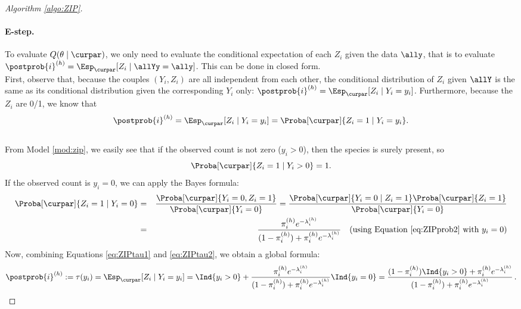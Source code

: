 \begin{proof}[Algorithm \ref{algo:ZIP}]
\paragraph{E-step.}
To evaluate $Q(\theta \mid \curpar)$, we only need to evaluate the conditional expectation of each $Z_i$ given the data $\ally$, that is to evaluate $\postprob{i}^{(h)} = \Esp_{\curpar}[Z_i \mid \allYy=\ally]$. This can be done in closed form. \\
First, observe that, because the couples $(Y_i, Z_i)$ are all independent from each other, the conditional distribution of $Z_i$ given $\allY$ is the same as its conditional distribution given the corresponding  $Y_i$ only: $
\postprob{i}^{(h)} = \Esp_{\curpar}[Z_i \mid Y_i=y_i]$. 
Furthermore, because the $Z_i$ are 0/1, we know that $$ \postprob{i}^{(h)} = \Esp_{\curpar}[Z_i \mid Y_i=y_i] = \Proba[\curpar]{Z_i = 1 \mid Y_i=y_i}.$$ \\
From Model \eqref{mod:zip}, we easily see that if the observed count is not zero ($y_i > 0$), then the species is surely present, so 
\begin{equation}\label{eq:ZIPtau1}
\Proba[\curpar]{Z_i = 1 \mid Y_i >0} = 1.
\end{equation}
If the observed count is $y_i=0$, we can apply the Bayes formula: 
\begin{eqnarray}\label{eq:ZIPtau2}
\Proba[\curpar]{Z_i = 1 \mid Y_i= 0} &=&  \frac{\Proba[\curpar]{Y_i= 0 ,  Z_i = 1}}{\Proba[\curpar]{Y_i= 0}} = \frac{\Proba[\curpar]{Y_i= 0 \mid   Z_i = 1}\Proba[\curpar]{Z_i=1}}{\Proba[\curpar]{Y_i= 0 }}\nonumber\\
 &=& \frac{\pi^{(h)}_i e^{-\lambda^{(h)}_i}}{ (1-\pi^{(h)}_i) + \pi^{(h)}_i e^{-\lambda^{(h)}_i}}  \quad \mbox{(using Equation \eqref{eq:ZIPprob2} with $y_i=0$)}
\end{eqnarray}
Now, combining Equations \eqref{eq:ZIPtau1} and \eqref{eq:ZIPtau2}, we obtain a global formula: 
\begin{equation*} %
\postprob{i}^{(h)}: =\tau(y_i) = \Esp_{\curpar}[Z_i \mid Y_i=y_i] 
=  \Ind{y_i > 0} + \frac{\pi^{(h)}_i e^{-\lambda^{(h)}_i}}{(1-\pi^{(h)}_i) + \pi^{(h)}_i e^{-\lambda^{(h)}_i}} \Ind{y_i = 0}
=\frac{(1 - \pi^{(h)}_i)\Ind{y_i > 0} + \pi^{(h)}_i e^{-\lambda^{(h)}_i}}{(1-\pi^{(h)}_i) + \pi^{(h)}_i e^{-\lambda^{(h)}_i}} \,.
\end{equation*}



\end{proof}
